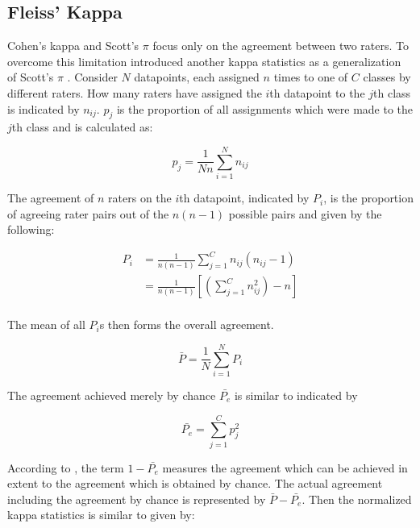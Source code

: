 \subsection{Fleiss' Kappa}
\label{chp:fundamentals:sec:inter_rater_agreement:subsec:fleiss_kappa}
Cohen's kappa and Scott's $\pi$ focus only on the agreement between two raters.
To overcome this limitation \textcite{Fleiss:1971} introduced another kappa statistics as a generalization of Scott's $\pi$ \parencite{Scott:1955}.
Consider $N$ datapoints, each assigned $n$ times to one of $C$ classes by different raters.
How many raters have assigned the $i$th datapoint to the $j$th class is indicated by $n_{ij}$.
$p_j$ is the proportion of all assignments which were made to the $j$th class and is calculated as:

\begin{equation}\label{eq:fleiss_pj}
    p_j = \frac{1}{Nn}\sum_{i=1}^N n_{ij}
\end{equation}

The agreement of $n$ raters on the $i$th datapoint, indicated by $P_i$, is the proportion of agreeing rater pairs out of the $n(n-1)$ possible pairs and given by the following:

\begin{equation}\label{eq:fleiss_Pi}
    \begin{aligned}
        P_i &= \frac{1}{n(n-1)} \sum_{j=1}^C n_{ij} (n_{ij}-1) \\
        &= \frac{1}{n(n-1)} \left[\left(\sum_{j=1}^C n_{ij}^2 \right) - n\right]\\
    \end{aligned}
\end{equation}

The mean of all $P_i$s then forms the overall agreement.

\begin{equation}\label{eq:fleiss_P_bar}
    \bar{P} = \frac{1}{N} \sum_{i=1}^N P_i
\end{equation}

The agreement achieved merely by chance $\bar{P_e}$ is similar to \textcite{Scott:1955} indicated by

\begin{equation}\label{eq:fleiss_P_e}
    \bar{P_e} = \sum_{j=1}^C p_j^2
\end{equation}

According to \textcite{Fleiss:1971}, the term $1-\bar{P_e}$ measures the agreement which can be achieved in extent to the agreement which is obtained by chance.
The actual agreement including the agreement by chance is represented by $\bar{P} - \bar{P_e}$.
Then the normalized kappa statistics is similar to \textcite{Cohen:1960} given by:

